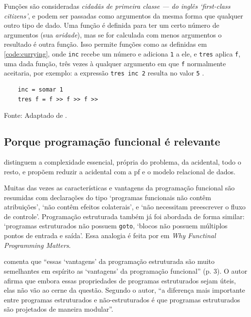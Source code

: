 Funções são consideradas \emph{cidadãs de primeira classe — do inglês ‘first-class
citizens’}, e podem ser passadas como argumentos da mesma forma que qualquer
outro tipo de dado.
Uma função é definida para ter um certo número de argumentos (sua \emph{aridade}),
mas se for calculada com menos argumentos o resultado é outra função.
Isso permite funções como as definidas em \ref{code:currying}, onde \texttt{inc} recebe
um número e adiciona \texttt{1} a ele, e \texttt{tres} aplica \texttt{f}, uma dada função, três
vezes à qualquer argumento em que \texttt{f} normalmente aceitaria, por exemplo: a
expressão \texttt{tres inc 2} resulta no valor \texttt{5} \cite{noble1994}.

\begin{listing}[H]
  \centering \caption{\emph{Currying}.}
  \begin{verbatim}
    inc = somar 1
    tres f = f >> f >> f >>
  \end{verbatim}
  \small Fonte: Adaptado de \textcite{noble1994}.
  \label{code:currying}
\end{listing}
\subsection{Porque programação funcional é relevante}
\label{sec:porque-programacao-funcional-e-relevante}
\textcite[p. 1 e 21]{moseley2006} distinguem a complexidade essencial,
própria do problema, da acidental, todo o resto, e propõem reduzir a
acidental com a \gls{pf} e o modelo relacional de dados.

Muitas das vezes as características e vantagens da programação funcional são
resumidas com declarações do tipo ‘programas funcionais não contêm
atribuições’, ‘não contêm efeitos colaterais’, e ‘não necessitam preescrever
o fluxo de controle’. Programação estruturada também já foi abordada de forma
similar: ‘programas estruturados não possuem \texttt{goto}, ‘blocos não
possuem múltiplos pontos de entrada e saída’. Essa analogia é feita por
\textcite{hughes1990} em \emph{Why Functinal Programming Matters}.

\textcite{hughes1990} comenta que “essas ‘vantagens’ da programação estruturada
são muito semelhantes em espírito as ‘vantagens’ da programação funcional”
(p. 3). O autor afirma que embora essas propriedades de programas
estruturados sejam úteis, elas não vão ao cerne da questão. Segundo o autor,
“a diferença mais importante entre programas estruturados e não-estruturados
é que programas estruturados são projetados de maneira modular”.

